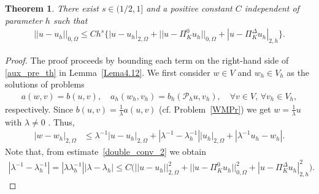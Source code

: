 \documentclass[final,reqno]{elsarticle}
\newtheorem{theorem}{Theorem}[section]
\def\O{\Omega}
\def\PiK{\Pi_{K}^{\Delta}}
\begin{document}
\begin{theorem}\label{Teor4.9}
There exist $s\in(1/2,1]$ and a positive constant $C$ independent of parameter $h$ such that
\begin{align*}
||u-u_h ||_{0,\O}\leq Ch^s\Big\{|u-u_h|_{2,\O}+||u-\Pi_K^0 u_h ||_{0,\Omega}+|u-\PiK  u_h|_{2,h}\Big\}.
\end{align*}
\end{theorem}
\begin{proof}
The proof proceeds by bounding each term on the right-hand side of  \eqref{aux_pre_th} in  Lemma~\ref{Lema4.12}. We first consider $w\in V$ and $w_h\in V_h$ as the solutions of problems
\begin{align}
a(w,v)=b(u,v), \quad
a_h(w_h,v_h)=b_h(\mathcal{P}_hu,v_h), \quad \forall v\in V,\, \forall v_h \in V_h \label{aux_disc_prob_apost},
\end{align}
respectively. Since $b(u,v)=\frac{1}{\lambda}a(u,v)$ (cf. Problem~\ref{WMPr}) we get $w=\frac{1}{\lambda}
u$ with $\lambda\neq 0$ . Thus, 
\begin{align}
|w-w_h|_{2,\O}&\leq \lambda^{-1}|u-u_h|_{2,\O}+|\lambda^{-1}-\lambda_h^{-1}||u_h|_{2,\O}+|\lambda^{-1}u_h-w_h|.\label{aux_1ap} 
\end{align}
Note that, from estimate~\ref{double_conv_2} we obtain
\begin{align}
|\lambda^{-1}-\lambda_h^{-1}|=|\lambda\lambda_{h}^{-1}||\lambda-\lambda_h|\leq C\Big( ||u-u_h||_{2,\Omega}^2 + ||u-\Pi_K^0 u_h||_{0,\Omega}^2 + |u- \PiK u_h|_{2,h}^2 \Big)\label{est_chu}.
\end{align}


\end{proof}
\end{document}
